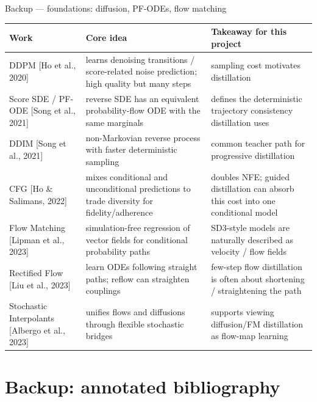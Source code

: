 \documentclass[aspectratio=169,10pt]{beamer}
\newcommand{\litref}[1]{{\scriptsize\color{black!55}[#1]}}
\begin{document}
\begin{frame}{Backup --- foundations: diffusion, PF-ODEs, flow matching}
  \scriptsize
  \begin{center}
  \begin{adjustbox}{max width=\textwidth}
  \begin{tabular}{@{}L{0.22\textwidth}L{0.33\textwidth}L{0.35\textwidth}@{}}
    \toprule
    \textbf{Work} & \textbf{Core idea} & \textbf{Takeaway for this project} \\
    \midrule
    DDPM \litref{Ho et al., 2020} & learns denoising transitions / score-related noise prediction; high quality but many steps & sampling cost motivates distillation \\
    Score SDE / PF-ODE \litref{Song et al., 2021} & reverse SDE has an equivalent probability-flow ODE with the same marginals & defines the deterministic trajectory consistency distillation uses \\
    DDIM \litref{Song et al., 2021} & non-Markovian reverse process with faster deterministic sampling & common teacher path for progressive distillation \\
    CFG \litref{Ho \& Salimans, 2022} & mixes conditional and unconditional predictions to trade diversity for fidelity/adherence & doubles NFE; guided distillation can absorb this cost into one conditional model \\
    Flow Matching \litref{Lipman et al., 2023} & simulation-free regression of vector fields for conditional probability paths & SD3-style models are naturally described as velocity / flow fields \\
    Rectified Flow \litref{Liu et al., 2023} & learn ODEs following straight paths; reflow can straighten couplings & few-step flow distillation is often about shortening / straightening the path \\
    Stochastic Interpolants \litref{Albergo et al., 2023} & unifies flows and diffusions through flexible stochastic bridges & supports viewing diffusion/FM distillation as flow-map learning \\
    \bottomrule
  \end{tabular}
  \end{adjustbox}
  \end{center}
\end{frame}

\section{Backup: annotated bibliography}
\end{document}
